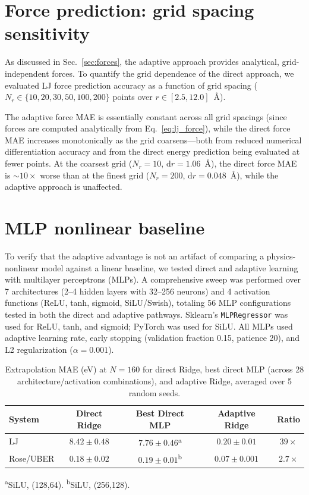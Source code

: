 \documentclass[aps,prb,twocolumn,superscriptaddress,longbibliography,floatfix]{revtex4-2}
\begin{document}
\section{Force prediction: grid spacing sensitivity}
\label{app:forces}

As discussed in Sec.~\ref{sec:forces}, the adaptive approach provides analytical, grid-independent forces. To quantify the grid dependence of the direct approach, we evaluated LJ force prediction accuracy as a function of grid spacing ($N_r \in \{10, 20, 30, 50, 100, 200\}$ points over $r \in [2.5, 12.0]$~\AA).

The adaptive force MAE is essentially constant across all grid spacings (since forces are computed analytically from Eq.~\eqref{eq:lj_force}), while the direct force MAE increases monotonically as the grid coarsens---both from reduced numerical differentiation accuracy and from the direct energy prediction being evaluated at fewer points. At the coarsest grid ($N_r = 10$, $\mathrm{d}r = 1.06$~\AA), the direct force MAE is $\sim$$10\times$ worse than at the finest grid ($N_r = 200$, $\mathrm{d}r = 0.048$~\AA), while the adaptive approach is unaffected.


\section{MLP nonlinear baseline}
\label{app:mlp}

To verify that the adaptive advantage is not an artifact of comparing a physics-nonlinear model against a linear baseline, we tested direct and adaptive learning with multilayer perceptrons (MLPs). A comprehensive sweep was performed over 7 architectures (2--4 hidden layers with 32--256 neurons) and 4 activation functions (ReLU, tanh, sigmoid, SiLU/Swish), totaling 56 MLP configurations tested in both the direct and adaptive pathways. Sklearn's \texttt{MLPRegressor} was used for ReLU, tanh, and sigmoid; PyTorch was used for SiLU. All MLPs used adaptive learning rate, early stopping (validation fraction 0.15, patience 20), and L2 regularization ($\alpha = 0.001$).

\begin{table}[h]
  \caption{Extrapolation MAE (eV) at $N = 160$ for direct Ridge, best direct MLP (across 28 architecture/activation combinations), and adaptive Ridge, averaged over 5 random seeds.}
  \label{tab:mlp}
  \begin{ruledtabular}
  \begin{tabular}{lcccc}
    System & Direct Ridge & Best Direct MLP & Adaptive Ridge & Ratio \\
    \hline
    LJ         & $8.42 \pm 0.48$ & $7.76 \pm 0.46$\textsuperscript{a} & $\mathbf{0.20 \pm 0.01}$ & $39\times$ \\
    Rose/UBER  & $0.18 \pm 0.02$ & $0.19 \pm 0.01$\textsuperscript{b} & $\mathbf{0.07 \pm 0.001}$ & $2.7\times$ \\
  \end{tabular}
  \end{ruledtabular}
  \textsuperscript{a}SiLU, (128,64). \textsuperscript{b}SiLU, (256,128).
\end{table}
\end{document}
